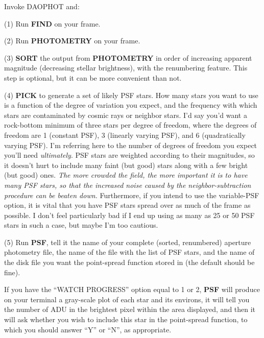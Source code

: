 \noindent Invoke DAOPHOT and:

\item{(1)} Run {\bf FIND} on your frame.

\item{(2)} Run {\bf PHOTOMETRY} on your frame.

\item{(3)} {\bf SORT} the output from {\bf PHOTOMETRY} in order of
increasing apparent magnitude (decreasing stellar brightness), with the
renumbering feature.  This step is optional, but it can be more
convenient than not.

\item{(4)} {\bf PICK} to generate a set of likely PSF stars.  How many
stars you want to use is a function of the degree of variation you
expect, and the frequency with which stars are contaminated by cosmic
rays or neighbor stars.  I'd say you'd want a rock-bottom minimum of
three stars per degree of freedom, where the degrees of freedom are 1
(constant PSF), 3 (linearly varying PSF), and 6 (quadratically varying
PSF).  I'm referring here to the number of degrees of freedom you
expect you'll need {\it ultimately\/}.  PSF stars are weighted
according to their magnitudes, so it doesn't hurt to include many faint
(but good) stars along with a few bright (but good) ones. {\it The more
crowded the field, the more important it is to have many PSF stars, so
that the increased noise caused by the neighbor-subtraction procedure
can be beaten down.} Furthermore, if you intend to use the variable-PSF
option, it is vital that you have PSF stars spread over as much of the
frame as possible.  I don't feel particularly bad if I end up using as
many as 25 or 50 PSF stars in such a case, but maybe I'm too cautious.

\item{(5)} Run {\bf PSF}, tell it the name of your complete (sorted,
renumbered) aperture photometry file, the name of the file with the
list of PSF stars, and the name of the disk file you want the
point-spread function stored in (the default should be fine).

 If you have the ``WATCH PROGRESS'' option equal to 1 or
2, {\bf PSF} will produce on your terminal a gray-scale plot of each
star and its environs, it will tell you the number of ADU in the
brightest pixel within the area displayed, and then it will 
ask whether you wish to include this star in the point-spread
function, to which you should answer ``Y'' or ``N'', as appropriate.

